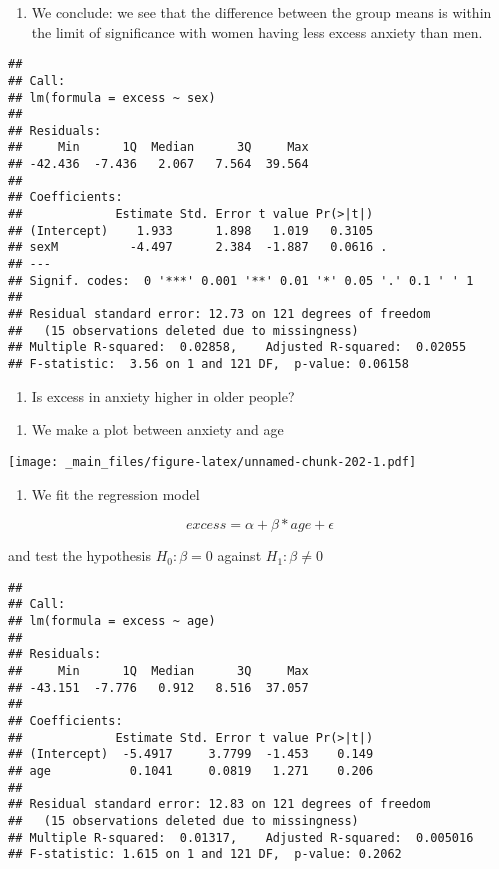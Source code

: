 \documentclass[
]{book}
\providecommand{\tightlist}{%
  \setlength{\itemsep}{0pt}\setlength{\parskip}{0pt}}
\begin{document}
\begin{enumerate}
\def\labelenumi{\alph{enumi}.}
\setcounter{enumi}{1}
\tightlist
\item
  We conclude: we see that the difference between the group means is within the limit of significance with women having less excess anxiety than men.
\end{enumerate}

\begin{verbatim}
## 
## Call:
## lm(formula = excess ~ sex)
## 
## Residuals:
##     Min      1Q  Median      3Q     Max 
## -42.436  -7.436   2.067   7.564  39.564 
## 
## Coefficients:
##             Estimate Std. Error t value Pr(>|t|)  
## (Intercept)    1.933      1.898   1.019   0.3105  
## sexM          -4.497      2.384  -1.887   0.0616 .
## ---
## Signif. codes:  0 '***' 0.001 '**' 0.01 '*' 0.05 '.' 0.1 ' ' 1
## 
## Residual standard error: 12.73 on 121 degrees of freedom
##   (15 observations deleted due to missingness)
## Multiple R-squared:  0.02858,    Adjusted R-squared:  0.02055 
## F-statistic:  3.56 on 1 and 121 DF,  p-value: 0.06158
\end{verbatim}

\begin{enumerate}
\def\labelenumi{\arabic{enumi}.}
\setcounter{enumi}{3}
\tightlist
\item
  Is excess in anxiety higher in older people?
\end{enumerate}

\begin{enumerate}
\def\labelenumi{\alph{enumi}.}
\tightlist
\item
  We make a plot between anxiety and age
\end{enumerate}

\texttt{[image: \_main\_files/figure-latex/unnamed-chunk-202-1.pdf]}

\begin{enumerate}
\def\labelenumi{\alph{enumi}.}
\setcounter{enumi}{1}
\tightlist
\item
  We fit the regression model
\end{enumerate}

\[excess = \alpha + \beta * age + \epsilon\]

and test the hypothesis \(H_0: \beta=0\) against \(H_1: \beta\neq 0\)

\begin{verbatim}
## 
## Call:
## lm(formula = excess ~ age)
## 
## Residuals:
##     Min      1Q  Median      3Q     Max 
## -43.151  -7.776   0.912   8.516  37.057 
## 
## Coefficients:
##             Estimate Std. Error t value Pr(>|t|)
## (Intercept)  -5.4917     3.7799  -1.453    0.149
## age           0.1041     0.0819   1.271    0.206
## 
## Residual standard error: 12.83 on 121 degrees of freedom
##   (15 observations deleted due to missingness)
## Multiple R-squared:  0.01317,    Adjusted R-squared:  0.005016 
## F-statistic: 1.615 on 1 and 121 DF,  p-value: 0.2062
\end{verbatim}
\end{document}
